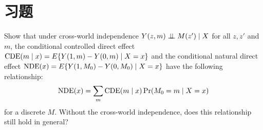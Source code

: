 \section{习题}\label{sec:28-homework}

\begin{HomeworkProblem}\label{exr:28-1}

Show that under cross-world independence
$
Y(z,m) \mathrel{\perp\!\!\!\perp} M(z') \mid X
$
for all $z,z'$ and $m$,  the conditional controlled direct effect $\mathrm{CDE}(m\mid x) = E\{  Y(1,m)  - Y(0,m)\mid X=x\}$ and the conditional natural direct effect $\mathrm{NDE}(x) = E\{   Y(1,M_0) - Y(0, M_0) \mid X=x  \}$ have the following relationship:
\[
\mathrm{NDE}(x) = \sum_m \mathrm{CDE}(m\mid x) \operatorname{Pr}(M_0 = m\mid X=x)
\]
for a discrete $M$. Without the cross-world independence, does this relationship still hold in general?



\end{HomeworkProblem}

